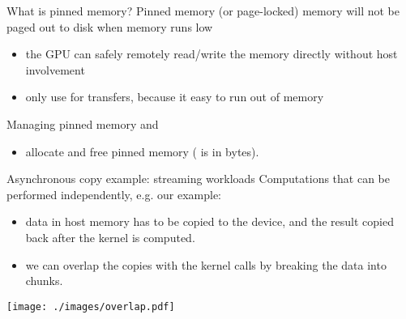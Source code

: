 \begin{frame}[fragile]{}
    \begin{info}{What is pinned memory?}
        Pinned memory (or page-locked) memory will not be paged out to disk when memory runs low
        \begin{itemize}
            \item the GPU can safely remotely read/write the memory directly without host involvement
            \item only use for transfers, because it easy to run out of memory
        \end{itemize}
    \end{info}

    \begin{info}{Managing pinned memory}
        \centering {} and 
        \begin{itemize}
            \item allocate and free pinned memory ( is in bytes).
        \end{itemize}
    \end{info}

\end{frame}

\begin{frame}[fragile]{}
    \begin{info}{Asynchronous copy example: streaming workloads}
        Computations that can be performed independently, e.g. our \axpy example:
        \begin{itemize}
            \item data in host memory has to be copied to the device, and the result copied back after the kernel is computed.
            \item we can overlap the copies with the kernel calls by breaking the data into chunks.
        \end{itemize}
    \end{info}
    \texttt{[image: ./images/overlap.pdf]}
\end{frame}

